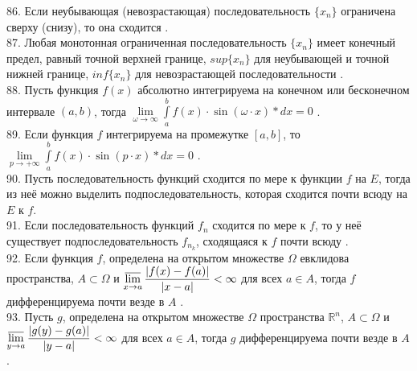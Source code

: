 \documentclass[12pt]{article}
\begin{document}
86. Если неубывающая (невозрастающая) последовательность ${\displaystyle \{x_n\}}$ ограничена сверху (снизу), то она сходится .\\

87. Любая монотонная ограниченная последовательность ${\displaystyle \{x_n\}}$ имеет конечный предел, равный точной верхней границе, ${\displaystyle sup \{x_n\}}$ для неубывающей и точной нижней границе, ${\displaystyle inf \{x_n\}}$ для невозрастающей последовательности .\\

88. Пусть функция ${\displaystyle f(x)}$ абсолютно интегрируема на конечном или бесконечном интервале ${\displaystyle (a,b)}$, тогда ${\displaystyle \lim \limits _{\omega \to \infty} \int \limits _{a}^{b} f(x)\cdot \sin (\omega\cdot x)*dx=0}$ .\\

89. Если функция ${\displaystyle f}$ интегрируема на промежутке ${\displaystyle [a,b]}$, то ${\displaystyle \lim \limits _{p \to +\infty} \int \limits _{a}^{b} f(x)\cdot \sin (p\cdot x)*dx=0}$ .\\

90. Пусть последовательность функций сходится по мере к функции ${\displaystyle f}$ на ${\displaystyle E}$, тогда из неё можно выделить подпоследовательность, которая сходится почти всюду на ${\displaystyle E}$ к ${\displaystyle f}$.\\

91. Если последовательность функций ${\displaystyle f_n}$ сходится по мере к ${\displaystyle f}$, то у неё существует подпоследовательность ${\displaystyle f_{n_k}}$, сходящаяся к ${\displaystyle f}$ почти всюду .\\

92. Если функция ${\displaystyle f}$, определена на открытом множестве ${\displaystyle \Omega }$ евклидова пространства, ${\displaystyle A\subset \Omega }$ и ${\displaystyle \varlimsup _{x\to a}{\frac {|f(x)-f(a)|}{|x-a|}}<\infty }$ для всех ${\displaystyle a\in A}$, тогда ${\displaystyle f}$ дифференцируема почти везде в ${\displaystyle A}$ .\\

93. Пусть ${\displaystyle g}$, определена на открытом множестве ${\displaystyle \Omega }$ пространства ${\displaystyle \mathbb {R}^{n}}$, ${\displaystyle A\subset \Omega }$ и ${\displaystyle \varlimsup _{y\to a}{\frac {|g(y)-g(a)|}{|y-a|}}<\infty }$ для всех ${\displaystyle a\in A}$, тогда ${\displaystyle g}$ дифференцируема почти везде в ${\displaystyle A}$ .\\
\end{document}
